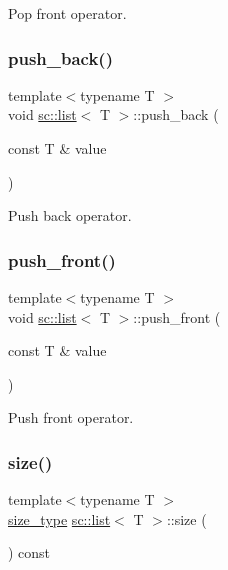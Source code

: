 Pop front operator. 

\mbox{\label{classsc_1_1list_a1d77cdaeacca7959989873617a753c96}} 
\subsubsection{\texorpdfstring{push\+\_\+back()}{push\_back()}}
{\footnotesize\ttfamily template$<$typename T $>$ \\
void \hyperlink{classsc_1_1list}{sc\+::list}$<$ T $>$\+::push\+\_\+back (\begin{DoxyParamCaption}\item[{const T \&}]{value }\end{DoxyParamCaption})\hspace{0.3cm}{\ttfamily [inline]}}



Push back operator. 

\mbox{\label{classsc_1_1list_a24a7b8a81765dfe0351ddb263bc6d754}} 
\subsubsection{\texorpdfstring{push\+\_\+front()}{push\_front()}}
{\footnotesize\ttfamily template$<$typename T $>$ \\
void \hyperlink{classsc_1_1list}{sc\+::list}$<$ T $>$\+::push\+\_\+front (\begin{DoxyParamCaption}\item[{const T \&}]{value }\end{DoxyParamCaption})\hspace{0.3cm}{\ttfamily [inline]}}



Push front operator. 

\mbox{\label{classsc_1_1list_a0fe585f3f9e33058294c3a590c7bfdea}} 
\subsubsection{\texorpdfstring{size()}{size()}}
{\footnotesize\ttfamily template$<$typename T $>$ \\
\hyperlink{classsc_1_1list_acbac64cff34d45bb9c61771493db48ec}{size\+\_\+type} \hyperlink{classsc_1_1list}{sc\+::list}$<$ T $>$\+::size (\begin{DoxyParamCaption}{ }\end{DoxyParamCaption}) const\hspace{0.3cm}{\ttfamily [inline]}}




